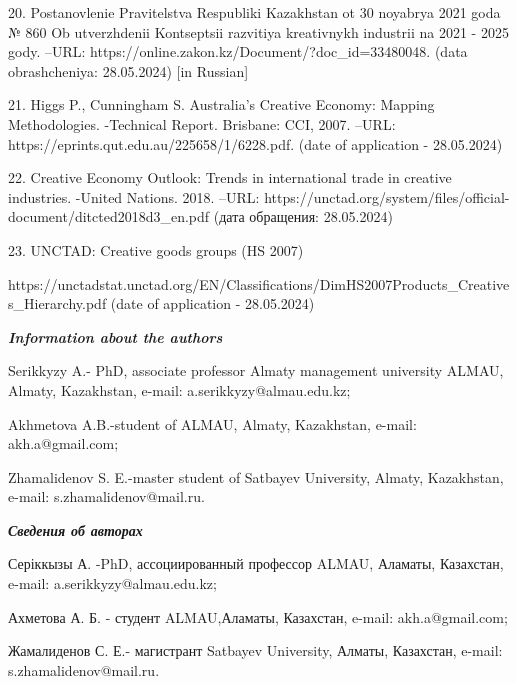 \begin{noparindent}
20. Postanovlenie Pravitel\textquotesingle stva Respubliki Kazakhstan ot
  30 noyabrya 2021 goda № 860 Ob utverzhdenii Kontseptsii razvitiya
  kreativnykh industrii na 2021 - 2025 gody. --URL:
  https://online.zakon.kz/Document/?doc\_id=33480048. (data
  obrashcheniya: 28.05.2024) {[}in Russian{]}

21. Higgs P., Cunningham S. Australia's Creative Economy: Mapping
  Methodologies. -Technical Report. Brisbane: CCI, 2007. --URL:
  https://eprints.qut.edu.au/225658/1/6228.pdf. (date of application -
  28.05.2024)

22. Creative Economy Outlook: Trends in international trade in creative
  industries. -United Nations. 2018. --URL:
  https://unctad.org/system/files/official-document/ditcted2018d3\_en.pdf
  (дата обращения: 28.05.2024)

23. UNCTAD: Creative goods groups (HS 2007)

  https://unctadstat.unctad.org/EN/Classifications/DimHS2007Products\_Creatives\_Hierarchy.pdf
  (date of application - 28.05.2024)
\end{noparindent}

\emph{{\bfseries Information about the authors}}

\begin{noparindent}
Serikkyzy A.- PhD, associate professor Almaty management university
ALMAU, Almaty, Kazakhstan, e-mail: a.serikkyzy@almau.edu.kz;

Akhmetova A.B.-student of ALMAU, Almaty, Kazakhstan, e-mail:
akh.a@gmail.com;

Zhamalidenov S. E.-master student of Satbayev University, Almaty,
Kazakhstan, e-mail: s.zhamalidenov@mail.ru.
\end{noparindent}

\emph{{\bfseries Сведения об авторах}}

\begin{noparindent}
Серіккызы А. -PhD, ассоциированный профессор ALMAU, Аламаты, Казахстан,
e-mail: a.serikkyzy@almau.edu.kz;

Ахметова А. Б. - студент ALMAU,Аламаты, Казахстан, e-mail:
akh.a@gmail.com;

Жамалиденов С. Е.- магистрант Satbayev University, Алматы, Казахстан,
e-mail: s.zhamalidenov@mail.ru.
\end{noparindent}
